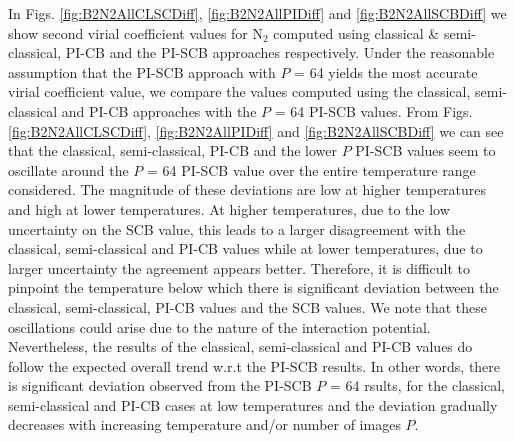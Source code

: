             In Figs. \ref{fig:B2N2AllCLSCDiff}, \ref{fig:B2N2AllPIDiff} and \ref{fig:B2N2AllSCBDiff} we show second virial coefficient values for N$_2$ computed using classical \& semi-classical, PI-CB and the PI-SCB approaches respectively. Under the reasonable assumption that the PI-SCB approach with $P$ = 64 yields the most accurate virial coefficient value, we compare the values computed using the classical, semi-classical and PI-CB approaches with the $P$ = 64 PI-SCB values. From Figs. \ref{fig:B2N2AllCLSCDiff}, \ref{fig:B2N2AllPIDiff} and \ref{fig:B2N2AllSCBDiff} we can see that the classical, semi-classical, PI-CB and the lower $P$ PI-SCB values seem to oscillate around the $P$ = 64 PI-SCB value over the entire temperature range considered. The magnitude of these deviations are low at higher temperatures and high at lower temperatures. At higher temperatures, due to the low uncertainty on the SCB value, this leads to a larger disagreement with the classical, semi-classical and PI-CB values while at lower temperatures, due to larger uncertainty the agreement appears better. Therefore, it is difficult to pinpoint the temperature below which there is significant deviation between the classical, semi-classical, PI-CB values and the SCB values. We note that these oscillations could arise due to the nature of the \abinitio{} interaction potential. Nevertheless, the results of the classical, semi-classical and PI-CB values do follow the expected overall trend w.r.t the PI-SCB results. In other words, there is significant deviation observed from the PI-SCB $P$ = 64 rsults, for the classical, semi-classical and PI-CB cases at low temperatures and the deviation gradually decreases with increasing temperature and/or number of images $P$.
